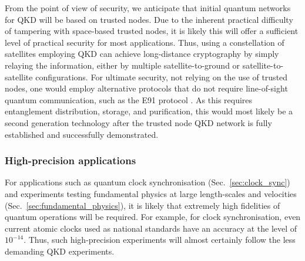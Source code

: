 From the point of view of security, we anticipate that initial quantum networks for QKD will be based on trusted nodes. Due to the inherent practical difficulty of tampering with space-based trusted nodes, it is likely this will offer a sufficient level of practical security for most applications. Thus, using a constellation of satellites employing QKD can achieve long-distance cryptography by simply relaying the information, either by multiple satellite-to-ground or satellite-to-satellite configurations. For ultimate security, not relying on the use of trusted nodes, one would employ alternative protocols that do not require line-of-sight quantum communication, such as the E91 protocol \cite{bib:ekert1991quantum}. As this requires entanglement distribution, storage, and purification, this would most likely be a second generation technology after the trusted node QKD network is fully established and successfully demonstrated. 

%
%

\subsubsection{High-precision applications}

For applications such as quantum clock synchronisation (Sec.~\ref{sec:clock_sync}) and experiments testing fundamental physics at large length-scales and velocities (Sec.~\ref{sec:fundamental_physics}), it is likely that extremely high fidelities of quantum operations will be required. For example, for clock synchronisation, even current atomic clocks used as national standards have an accuracy at the level of $10^{-14}$. Thus, such high-precision experiments will almost certainly follow the less demanding QKD experiments.

